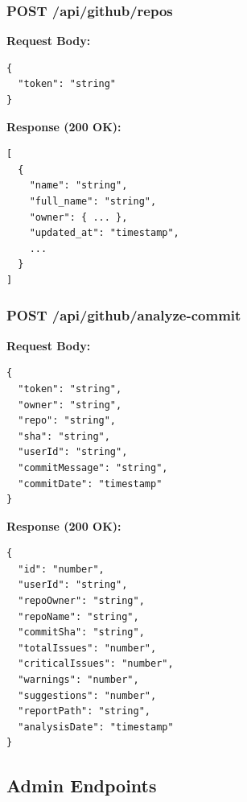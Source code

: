 \documentclass[12pt,a4paper]{article}
\begin{document}
    \subsubsection{POST /api/github/repos}

    \textbf{Request Body:}
    \begin{verbatim}
{
  "token": "string"
}
    \end{verbatim}

    \textbf{Response (200 OK):}
    \begin{verbatim}
[
  {
    "name": "string",
    "full_name": "string",
    "owner": { ... },
    "updated_at": "timestamp",
    ...
  }
]
    \end{verbatim}

    \subsubsection{POST /api/github/analyze-commit}

    \textbf{Request Body:}
    \begin{verbatim}
{
  "token": "string",
  "owner": "string",
  "repo": "string",
  "sha": "string",
  "userId": "string",
  "commitMessage": "string",
  "commitDate": "timestamp"
}
    \end{verbatim}

    \textbf{Response (200 OK):}
    \begin{verbatim}
{
  "id": "number",
  "userId": "string",
  "repoOwner": "string",
  "repoName": "string",
  "commitSha": "string",
  "totalIssues": "number",
  "criticalIssues": "number",
  "warnings": "number",
  "suggestions": "number",
  "reportPath": "string",
  "analysisDate": "timestamp"
}
    \end{verbatim}

    \subsection{Admin Endpoints}
\end{document}
